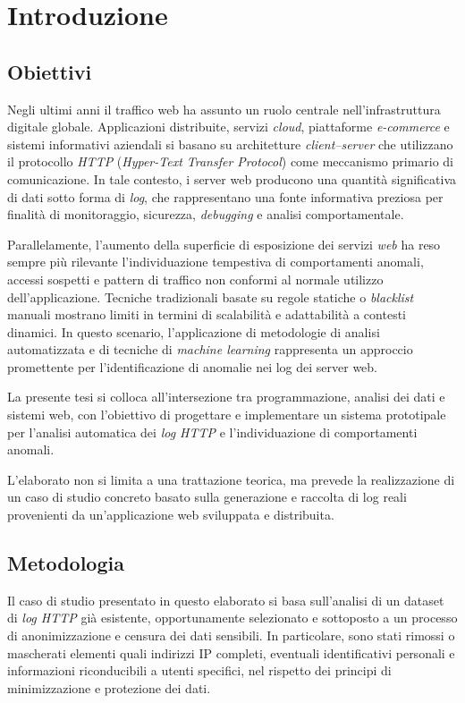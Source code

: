 \chapter*{Introduzione}

\section*{Obiettivi}

Negli ultimi anni il traffico web ha assunto un ruolo centrale nell’infrastruttura digitale globale. Applicazioni distribuite, servizi \emph{cloud}, piattaforme \emph{e-commerce }e sistemi informativi aziendali si basano su architetture \emph{client–server} che utilizzano il protocollo \emph{HTTP} (\emph{Hyper-Text Transfer Protocol}) come meccanismo primario di comunicazione. In tale contesto, i server web producono una quantità significativa di dati sotto forma di \emph{log}, che rappresentano una fonte informativa preziosa per finalità di monitoraggio, sicurezza, \emph{debugging} e analisi comportamentale.

Parallelamente, l’aumento della superficie di esposizione dei servizi \emph{web} ha reso sempre più rilevante l’individuazione tempestiva di comportamenti anomali, accessi sospetti e pattern di traffico non conformi al normale utilizzo dell’applicazione. Tecniche tradizionali basate su regole statiche o \emph{blacklist} manuali mostrano limiti in termini di scalabilità e adattabilità a contesti dinamici. In questo scenario, l’applicazione di metodologie di analisi automatizzata e di tecniche di \emph{machine learning} rappresenta un approccio promettente per l’identificazione di anomalie nei log dei server web.

La presente tesi si colloca all’intersezione tra programmazione, analisi dei dati e sistemi web, con l’obiettivo di progettare e implementare un sistema prototipale per l’analisi automatica dei \emph{log HTTP} e l’individuazione di comportamenti anomali.

L’elaborato non si limita a una trattazione teorica, ma prevede la realizzazione di un caso di studio concreto basato sulla generazione e raccolta di log reali provenienti da un’applicazione web sviluppata e distribuita.

\section*{Metodologia}
Il caso di studio presentato in questo elaborato si basa sull’analisi di un dataset di \emph{log HTTP} già esistente, opportunamente selezionato e sottoposto a un processo di anonimizzazione e censura dei dati sensibili. In particolare, sono stati rimossi o mascherati elementi quali indirizzi IP completi, eventuali identificativi personali e informazioni riconducibili a utenti specifici, nel rispetto dei principi di minimizzazione e protezione dei dati.

